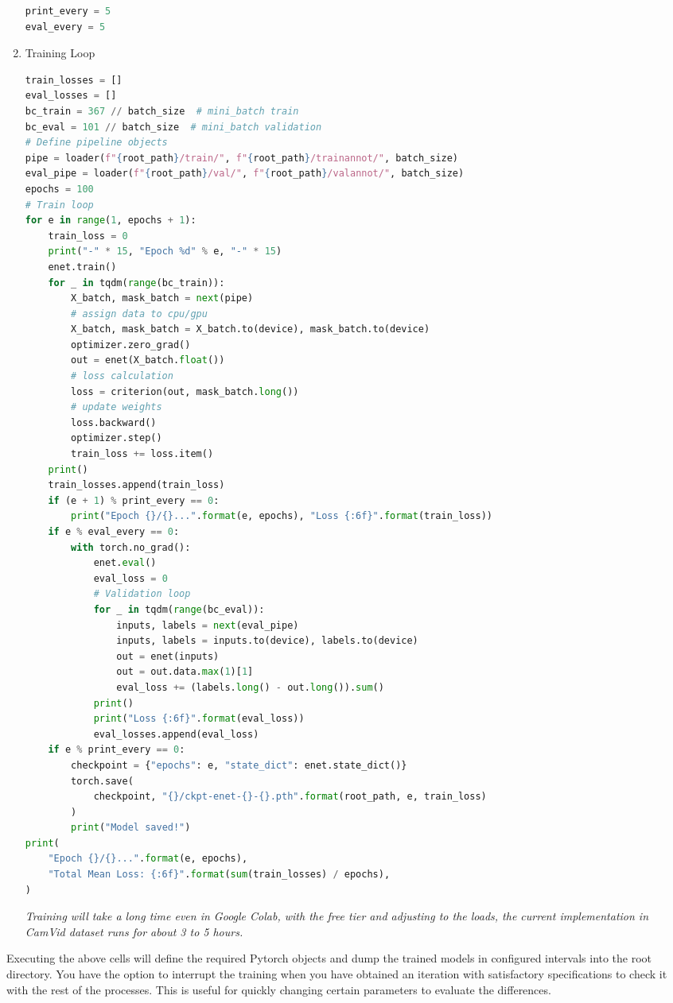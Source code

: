 \begin{enumerate}
\begin{lstlisting}[language=Python]
print_every = 5
eval_every = 5
                        \end{lstlisting}
	\item Training Loop
	      \begin{lstlisting}[language=Python]
train_losses = []
eval_losses = []
bc_train = 367 // batch_size  # mini_batch train
bc_eval = 101 // batch_size  # mini_batch validation
# Define pipeline objects
pipe = loader(f"{root_path}/train/", f"{root_path}/trainannot/", batch_size)
eval_pipe = loader(f"{root_path}/val/", f"{root_path}/valannot/", batch_size)
epochs = 100
# Train loop
for e in range(1, epochs + 1):
    train_loss = 0
    print("-" * 15, "Epoch %d" % e, "-" * 15)
    enet.train()
    for _ in tqdm(range(bc_train)):
        X_batch, mask_batch = next(pipe)
        # assign data to cpu/gpu
        X_batch, mask_batch = X_batch.to(device), mask_batch.to(device)
        optimizer.zero_grad()
        out = enet(X_batch.float())
        # loss calculation
        loss = criterion(out, mask_batch.long())
        # update weights
        loss.backward()
        optimizer.step()
        train_loss += loss.item()
    print()
    train_losses.append(train_loss)
    if (e + 1) % print_every == 0:
        print("Epoch {}/{}...".format(e, epochs), "Loss {:6f}".format(train_loss))
    if e % eval_every == 0:
        with torch.no_grad():
            enet.eval()
            eval_loss = 0
            # Validation loop
            for _ in tqdm(range(bc_eval)):
                inputs, labels = next(eval_pipe)
                inputs, labels = inputs.to(device), labels.to(device)
                out = enet(inputs)
                out = out.data.max(1)[1]
                eval_loss += (labels.long() - out.long()).sum()
            print()
            print("Loss {:6f}".format(eval_loss))
            eval_losses.append(eval_loss)
    if e % print_every == 0:
        checkpoint = {"epochs": e, "state_dict": enet.state_dict()}
        torch.save(
            checkpoint, "{}/ckpt-enet-{}-{}.pth".format(root_path, e, train_loss)
        )
        print("Model saved!")
print(
    "Epoch {}/{}...".format(e, epochs),
    "Total Mean Loss: {:6f}".format(sum(train_losses) / epochs),
)
                        \end{lstlisting}
	      \textit{Training will take a long time even in Google Colab, with the free tier and adjusting to the loads, the current implementation in CamVid dataset runs for about 3 to 5 hours.}
\end{enumerate}
Executing the above cells will define the required Pytorch objects and dump the trained models in configured intervals into the root directory. You have the option to interrupt the training when you have obtained an iteration with satisfactory specifications to check it with the rest of the processes. This is useful for quickly changing certain parameters to evaluate the differences.

